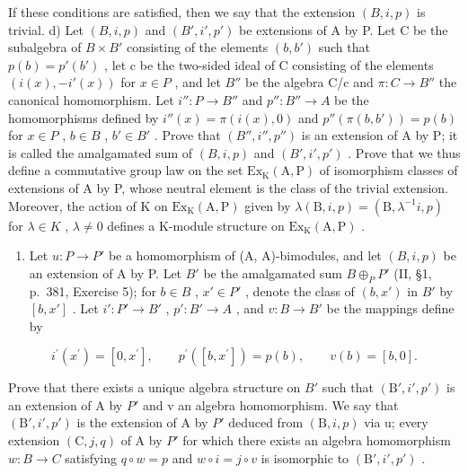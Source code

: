 If these conditions are satisfied, then we say that the extension \((B,i,p)\) is trivial. d) Let \((B,i,p)\) and \((B',i',p')\) be extensions of A by P. Let C be the subalgebra of \(B \times B'\) consisting of the elements \((b,b')\) such that \(p(b) = p'(b')\) , let c be the two-sided ideal of C consisting of the elements \((i(x), -i'(x))\) for \(x \in P\) , and let \(B''\) be the algebra C/c and \(\pi : C \to B''\) the canonical homomorphism. Let \(i'' : P \to B''\) and \(p'' : B'' \to A\) be the homomorphisms defined by \(i''(x) = \pi(i(x),0)\) and \(p''(\pi(b,b')) = p(b)\) for \(x \in P\) , \(b \in B\) , \(b' \in B'\) . Prove that \((B'', i'', p'')\) is an extension of A by P; it is called the amalgamated sum of \((B,i,p)\) and \((B',i',p')\) . Prove that we thus define a commutative group law on the set \(\mathrm{Ex}_{\mathrm{K}}(\mathrm{A},\mathrm{P})\) of isomorphism classes of extensions of A by P, whose neutral element is the class of the trivial extension. Moreover, the action of K on \(\mathrm{Ex}_{\mathrm{K}}(\mathrm{A},\mathrm{P})\) given by \(\lambda(\mathrm{B},i,p) = (\mathrm{B},\lambda^{-1}i,p)\) for \(\lambda \in K\) , \(\lambda \neq 0\) defines a K-module structure on \(\mathrm{Ex}_{\mathrm{K}}(\mathrm{A},\mathrm{P})\) .

\begin{enumerate}
\def\labelenumi{\alph{enumi})}
\setcounter{enumi}{4}
\tightlist
\item
  Let \(u: P \to P'\) be a homomorphism of (A, A)-bimodules, and let \((B, i, p)\) be an extension of A by P. Let \(B'\) be the amalgamated sum \(B \oplus_{P} P'\) (II, §1, p.~381, Exercise 5); for \(b \in B\) , \(x' \in P'\) , denote the class of \((b, x')\) in \(B'\) by \([b, x']\) . Let \(i': P' \to B'\) , \(p': B' \to A\) , and \(v: B \to B'\) be the mappings define by
\end{enumerate}

\[
i ^ {\prime} (x ^ {\prime}) = [ 0, x ^ {\prime} ], \qquad p ^ {\prime} ([ b, x ^ {\prime} ]) = p (b), \qquad v (b) = [ b, 0 ].
\]

Prove that there exists a unique algebra structure on \(B'\) such that \((\mathrm{B}', i', p')\) is an extension of A by \(P'\) and v an algebra homomorphism. We say that \((\mathrm{B}', i', p')\) is the extension of A by \(P'\) deduced from \((\mathrm{B}, i, p)\) via u; every extension \((\mathrm{C}, j, q)\) of A by \(P'\) for which there exists an algebra homomorphism \(w: B \to C\) satisfying \(q \circ w = p\) and \(w \circ i = j \circ v\) is isomorphic to \((\mathrm{B}', i', p')\) .

